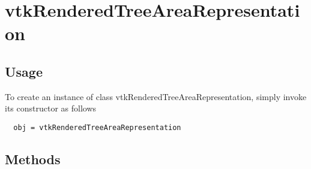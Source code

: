 \section{vtkRenderedTreeAreaRepresentation}

\subsection{Usage}


To create an instance of class vtkRenderedTreeAreaRepresentation, simply
invoke its constructor as follows
\begin{verbatim}
  obj = vtkRenderedTreeAreaRepresentation
\end{verbatim}
\subsection{Methods}

